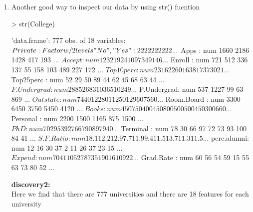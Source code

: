 \documentclass[a4paper]{article}
\begin{document}
\begin{enumerate}
\item Another good way to inspect our data by using str() fucntion
\begin{Schunk}
\begin{Sinput}
> str(College)
\end{Sinput}
\begin{Soutput}
'data.frame':	777 obs. of  18 variables:
 $ Private    : Factor w/ 2 levels "No","Yes": 2 2 2 2 2 2 2 2 2 2 ...
 $ Apps       : num  1660 2186 1428 417 193 ...
 $ Accept     : num  1232 1924 1097 349 146 ...
 $ Enroll     : num  721 512 336 137 55 158 103 489 227 172 ...
 $ Top10perc  : num  23 16 22 60 16 38 17 37 30 21 ...
 $ Top25perc  : num  52 29 50 89 44 62 45 68 63 44 ...
 $ F.Undergrad: num  2885 2683 1036 510 249 ...
 $ P.Undergrad: num  537 1227 99 63 869 ...
 $ Outstate   : num  7440 12280 11250 12960 7560 ...
 $ Room.Board : num  3300 6450 3750 5450 4120 ...
 $ Books      : num  450 750 400 450 800 500 500 450 300 660 ...
 $ Personal   : num  2200 1500 1165 875 1500 ...
 $ PhD        : num  70 29 53 92 76 67 90 89 79 40 ...
 $ Terminal   : num  78 30 66 97 72 73 93 100 84 41 ...
 $ S.F.Ratio  : num  18.1 12.2 12.9 7.7 11.9 9.4 11.5 13.7 11.3 11.5 ...
 $ perc.alumni: num  12 16 30 37 2 11 26 37 23 15 ...
 $ Expend     : num  7041 10527 8735 19016 10922 ...
 $ Grad.Rate  : num  60 56 54 59 15 55 63 73 80 52 ...
\end{Soutput}
\end{Schunk}
{
\colorbox{BurntOrange}{\textbf{discovery2:}}\color{red}\\
Here we find that there are 777 universities and there are 18 features for each university
}



\end{enumerate}
\end{document}

